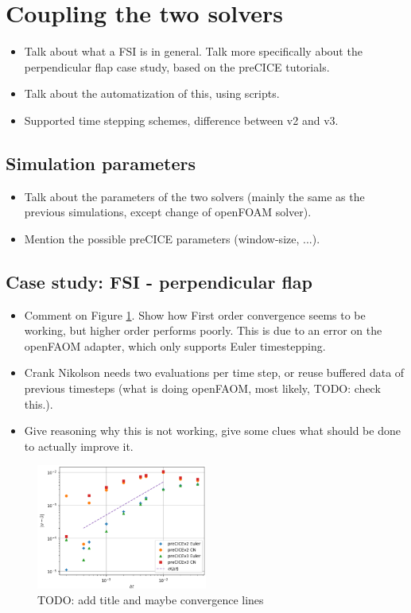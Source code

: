 \documentclass[
  english,        %
  font=times,     %
  onecolumn,      %
]{tumarticle}
\begin{document}
\section{Coupling the two solvers}
\begin{itemize}
    \item Talk about what a FSI is in general. Talk more specifically about the perpendicular flap case study, based on the preCICE tutorials.
    \item Talk about the automatization of this, using scripts.
    \item Supported time stepping schemes, difference between v2 and v3.
\end{itemize}
\subsection{Simulation parameters}
    \begin{itemize}
    \item Talk about the parameters of the two solvers (mainly the same as the previous simulations, except change of openFOAM solver). 
    \item Mention the possible preCICE parameters (window-size, ...).
    \end{itemize} 

\subsection{Case study: FSI - perpendicular flap}
\begin{itemize}
    \item Comment on Figure \ref{fig:coupled_v2_v3}. Show how First order convergence seems to be working, but higher order performs poorly. This is due to an error on the openFAOM adapter, which only supports Euler timestepping.
    \item Crank Nikolson needs two evaluations per time step, or reuse buffered data of previous timesteps (what is doing openFAOM, most likely, TODO: check this.).
    \item Give reasoning why this is not working, give some clues what should be done to actually improve it.
\end{itemize}


\begin{figure}[!ht]
    \centering
    \includegraphics[width=0.5\textwidth]{resources/coupled_v2_v3_results.png}
    \caption{TODO: add title and maybe convergence lines}
    \label{fig:coupled_v2_v3}
\end{figure}
\end{document}
